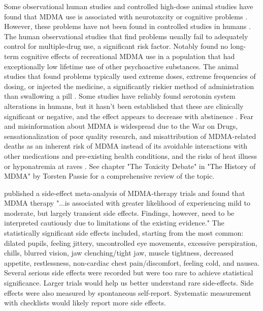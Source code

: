 \documentclass[12pt,letterpaper]{book}
\begin{document}
Some observational human studies and controlled high-dose animal studies have found that MDMA use is associated with neurotoxcity or cognitive problems \cite{passieHistory}. However, these problems have not been found in controlled studies in humans \cite{halpernMormonRavers}. The human observational studies that find problems usually fail to adequately control for multiple-drug use, a significant risk factor. Notably \textcite{halpernMormonRavers} found no long-term cognitive effects of recreational MDMA use in a population that had exceptionally low lifetime use of other psychoactive substances. The animal studies that found problems typically used extreme doses, extreme frequencies of dosing, or injected the medicine, a significantly riskier method of administration than swallowing a pill \cite{passieHistory}. Some studies have reliably found serotonin system alterations in humans, but it hasn't been established that these are clinically significant or negative, and the effect appears to decrease with abstinence \cite{gouzoulis2006neurotoxicity}. Fear and misinformation about MDMA is widespread due to the War on Drugs, sensationalization of poor quality research, and misattribution of MDMA-related deaths as an inherent risk of MDMA instead of its avoidable interactions with other medications and pre-existing health conditions, and the risks of heat illness or hyponatremia at raves \cite{passieHistory}. See chapter "The Toxicity Debate" in "The History of MDMA" by Torsten Passie for a comprehensive review of the topic.

\textcite{colcott2024side} published a side-effect meta-analysis of MDMA-therapy trials and found that MDMA therapy "...is associated with greater likelihood of experiencing mild to moderate, but largely transient side effects. Findings, however, need to be interpreted cautiously due to limitations of the existing evidence." The statistically significant side effects included, starting from the most common: dilated pupils, feeling jittery, uncontrolled eye movements, excessive perspiration, chills, blurred vision, jaw clenching/tight jaw, muscle tightness, decreased appetite, restlessness, non-cardiac chest pain/discomfort, feeling cold, and nausea. Several serious side effects were recorded but were too rare to achieve statistical significance. Larger trials would help us better understand rare side-effects. Side effects were also measured by spontaneous self-report. Systematic measurement with checklists would likely report more side effects.
\end{document}
